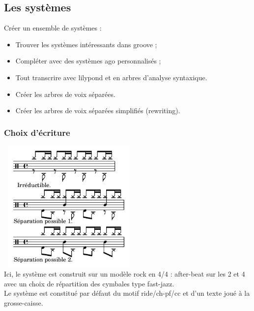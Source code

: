 \subsection{Les systèmes}
Créer un ensemble de systèmes :
\begin{itemize}
\item Trouver les systèmes intéressants dans groove ;
\item Compléter avec des systèmes ago personnalisés ;
\item Tout transcrire avec lilypond et en arbres d’analyse syntaxique.
\item Créer les arbres de voix séparées.
\item Créer les arbres de voix séparées simplifiés (rewriting).\\	
\end{itemize}

\subsubsection{Choix d’écriture}
\includegraphics[height=65mm, width=70mm]{images/notation/experimentations/separation_drummer_01_session1_004.png}\\
Ici, le système est construit sur un modèle rock en 4/4 : after-beat sur les 2 et 4 avec un choix de répartition des cymbales type fast-jazz.\\
Le système est constitué par défaut du motif ride/ch-pf/cc et d’un texte joué à la grosse-caisse.\\


